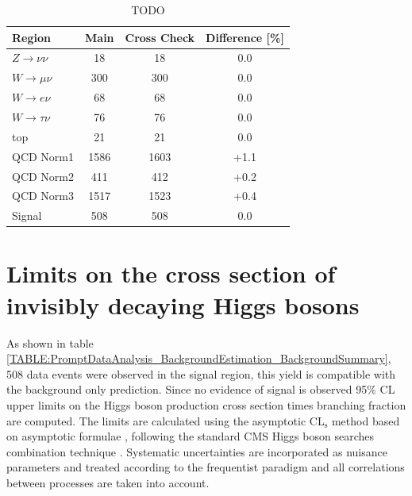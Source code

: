\begin{table}[!htb]
\centering
\begin{tabular}{|l|c|c|c|}
\hline
Region                & Main & Cross Check & Difference [\%] \\
\hline\hline
$Z\rightarrow\nu\nu$  &   18 &          18 &             0.0 \\
$W\rightarrow\mu\nu$  &  300 &         300 &             0.0 \\
$W\rightarrow e\nu$   &   68 &          68 &             0.0 \\
$W\rightarrow\tau\nu$ &   76 &          76 &             0.0 \\
top                   &   21 &          21 &             0.0 \\
QCD Norm1             & 1586 &        1603 &            +1.1 \\
QCD Norm2             &  411 &         412 &            +0.2 \\
QCD Norm3             & 1517 &        1523 &            +0.4 \\
\hline\hline
Signal                &  508 &         508 &             0.0 \\
\hline
\end{tabular}
\caption{TODO}
\label{TABLE:ParkedDataAnalysis_Results_MainCrossCheckComparison}
\end{table}



\section{Limits on the cross section of invisibly decaying Higgs bosons}
\label{SECTION:ParkedDataAnalysis_Limits}


As shown in table \ref{TABLE:PromptDataAnalysis_BackgroundEstimation_BackgroundSummary}, 508 data events were observed in the signal region, this yield is compatible with the background only prediction. Since no evidence of signal is observed 95\% \gls{CL} upper limits on the Higgs boson production cross section times branching fraction are computed. The limits are calculated using the asymptotic $\mathrm{CL}_\mathrm{s}$ method \cite{ARTICLE:CLsTechnique,ARTICLE:CLCompForCombiningSearchesWithSmallStat,ARTICLE:HandbookofLHCHiggsCrossSectionsDifferentialDistributions} based on asymptotic formulae \cite{ARTICLE:AsymptoticCLS}, following the standard \gls{CMS} Higgs boson searches combination technique \cite{ARTICLE:CMS_HiggsDiscovery,ARTICLE:HiggsCombination}. Systematic uncertainties are incorporated as nuisance parameters and treated according to the frequentist paradigm \cite{ARTICLE:HiggsCombination} and all correlations between processes are taken into account.

